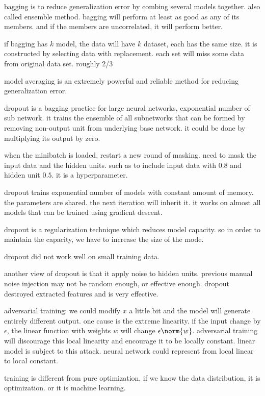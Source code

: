 bagging is to reduce generalization error by combing several models together. also called ensemble method. bagging will perform at least as good as any of its members. and if the members are uncorrelated, it will perform better. 

if bagging has $k$ model, the data will have $k$ dataset, each has the same size. it is constructed by selecting data with replacement. each set will miss some data from original data set. roughly 2/3

model averaging is an extremely powerful and reliable method for reducing generalization error.


dropout is a bagging practice for large neural networks, exponential number of sub network. it trains the ensemble of all subnetworks that can be formed by removing non-output unit from underlying base network. it could be done by multiplying its output by zero.

when the minibatch is loaded, restart a new round of masking. need to mask the input data and the hidden units. such as to include input data with $0.8$ and hidden unit $0.5$. it is a hyperparameter.

dropout trains exponential number of models with constant amount of memory. the parameters are shared. the next iteration will inherit it. it works on almost all models that can be trained using gradient descent.

dropout is a regularization technique which reduces model capacity. so in order to maintain the capacity, we have to increase the size of the mode.

dropout did not work well on small training data.

another view of dropout is that it apply noise to hidden units. previous manual noise injection may not be random enough, or effective enough. dropout destroyed extracted features and is very effective.

adversarial training: we could modify $x$ a little bit and the model will generate entirely different output. one cause is the extreme linearity. if the input change by $\epsilon$, the linear function with weights $w$ will change $\epsilon \norm{w}$. adversarial training will discourage this local linearity and encourage it to be locally constant. linear model is subject to this attack. neural network could represent from local linear to local constant.

training is different from pure optimization. if we know the data distribution, it is optimization. or it is machine learning.

